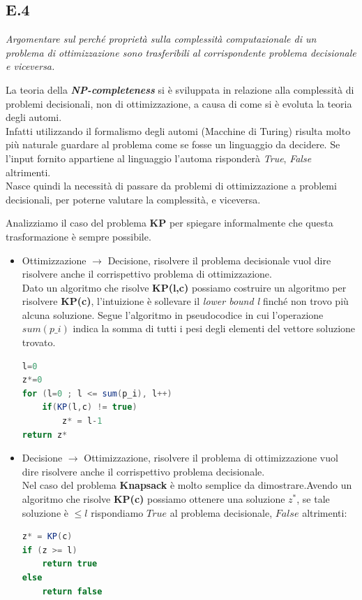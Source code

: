 \documentclass[a4paper]{article}
\newcommand{\imp}[1]{\textbf{\textit{#1}}}
\begin{document}
\subsection{E.4}
\emph{Argomentare sul perché proprietà sulla complessità computazionale di un problema di ottimizzazione sono trasferibili al corrispondente problema decisionale e viceversa.}


La teoria della \imp{NP-completeness} si è sviluppata in relazione alla complessità di problemi decisionali, non di ottimizzazione, a causa di come si è evoluta la teoria degli automi.\\
Infatti utilizzando il formalismo degli automi (Macchine di Turing) risulta molto più naturale guardare al problema come se fosse un linguaggio da decidere. Se l'input fornito appartiene al linguaggio l'automa risponderà \textit{True}, \textit{False} altrimenti.\\
Nasce quindi la necessità di passare da problemi di ottimizzazione a problemi decisionali, per poterne valutare la complessità, e viceversa.

Analizziamo il caso del problema \textbf{KP} per spiegare informalmente che questa trasformazione è sempre possibile.
\begin{itemize}
	\item Ottimizzazione $\rightarrow$ Decisione, risolvere il problema decisionale vuol dire risolvere anche il corrispettivo problema di ottimizzazione.\\
	Dato un algoritmo che risolve \textbf{KP(l,c)} possiamo costruire un algoritmo per risolvere \textbf{KP(c)}, l'intuizione è sollevare il \textit{lower bound l} finché non trovo più alcuna soluzione.
Segue l'algoritmo in pseudocodice in cui l'operazione $sum(p\_i)$ indica la somma di tutti i pesi degli elementi del vettore soluzione trovato.
\begin{lstlisting}[xleftmargin=15pt, language=Java ]
l=0
z*=0
for (l=0 ; l <= sum(p_i), l++)
    if(KP(l,c) != true)
        z* = l-1
return z*
\end{lstlisting}
\item Decisione $\rightarrow$ Ottimizzazione, risolvere il problema di ottimizzazione vuol dire risolvere anche il corrispettivo problema decisionale.\\
	Nel caso del problema \textbf{Knapsack} è molto semplice da dimostrare.Avendo un algoritmo che risolve \textbf{KP(c)} possiamo ottenere una soluzione $z^*$, se tale soluzione è $\leq l$ rispondiamo $True$ al problema decisionale, $False$ altrimenti:

\begin{lstlisting}[xleftmargin=15pt, language=Java ]
z* = KP(c)
if (z >= l)
    return true
else
    return false
\end{lstlisting}
\end{itemize}
\end{document}
